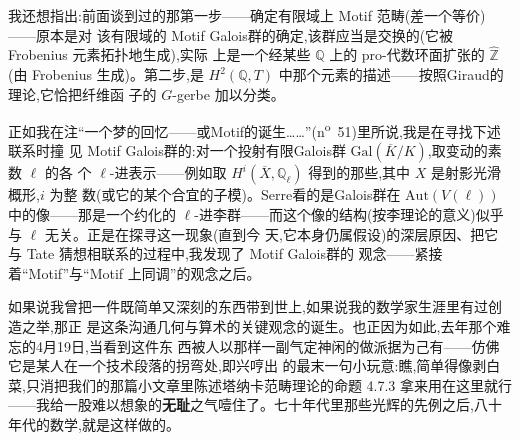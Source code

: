 我还想指出:前面谈到过的那第一步——确定有限域上 Motif 范畴(差一个等价)——原本是对
该有限域的 Motif\dmark{} Galois群的确定,该群应当是交换的(它被 Frobenius 元素拓扑地生成),实际
上是一个经某些 $\mathbb{Q}$ 上的 pro-代数环面扩张的 $\widehat{\mathbb{Z}}$(由 Frobenius 生成)。第二步,是 $H^2(\mathbb{Q},T)$ 中那个元素的描述——按照Giraud的理论,它恰把纤维函
子的 $G$-gerbe 加以分类。

正如我在注“一个梦的回忆——或Motif的诞生……”(n\textsuperscript{o}~51)里所说,我是在寻找下述联系时撞
见 Motif Galois群的:对一个投射有限Galois群 $\mathrm{Gal}(\overline{K}/K)$,取变动的素数 $\ell$ 的各
个 $\ell$-进表示——例如取 $H^i(\overline{X},\mathbb{Q}_\ell)$ 得到的那些,其中 $X$ 是射影光滑概形,$i$ 为整
数(或它的某个合宜的子模)。Serre看的是Galois群在 $\mathrm{Aut}(V(\ell))$ 中的像——那是一个约化的
$\ell$-进李群——而这个像的结构(按李理论的意义)似乎与 $\ell$ 无关。正是在探寻这一现象(直到今
天,它本身仍属假设)的深层原因、把它与 Tate 猜想相联系的过程中,我发现了 Motif Galois群的
观念——紧接着“Motif”与“Motif 上同调”的观念之后。

如果说我曾把一件既简单又深刻的东西带到世上,如果说我的数学家生涯里有过创造之举,那正
是这条沟通几何与算术的关键观念的诞生。也正因为如此,去年那个难忘的4月19日,当看到这件东
西被人以那样一副气定神闲的做派据为己有——仿佛它是某人在一个技术段落的拐弯处,即兴哼出
的最末一句小玩意:瞧,简单得像剥白菜,只消把我们的那篇小文章里陈述塔纳卡范畴理论的命题
4.7.3 拿来用在这里就行——我给一股难以想象的\textbf{无耻}之气噎住了。七十年代里那些光辉的\dmark{}先例之后,八十年代的数学,就是这样做的。

